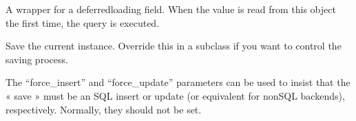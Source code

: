\documentclass[letterpaper,10pt,french]{sphinxmanual}
\begin{document}
\begin{fulllineitems}
\begin{fulllineitems}
\label{\detokenize{main/model:main.models.CorrespondanceMaquette.nouvelle}}
\pysigstartsignatures
{}
\pysigstopsignatures
\sphinxAtStartPar
A wrapper for a deferred\sphinxhyphen{}loading field. When the value is read from this
object the first time, the query is executed.

\end{fulllineitems}


\begin{fulllineitems}
\label{\detokenize{main/model:main.models.CorrespondanceMaquette.objects}}
\pysigstartsignatures
{}
\pysigstopsignatures
\end{fulllineitems}


\begin{fulllineitems}
\label{\detokenize{main/model:main.models.CorrespondanceMaquette.save}}
\pysigstartsignatures
{}
\pysigstopsignatures
\sphinxAtStartPar
Save the current instance. Override this in a subclass if you want to
control the saving process.

\sphinxAtStartPar
The “force\_insert” and “force\_update” parameters can be used to insist
that the « save » must be an SQL insert or update (or equivalent for
non\sphinxhyphen{}SQL backends), respectively. Normally, they should not be set.

\end{fulllineitems}


\end{fulllineitems}

\end{document}
